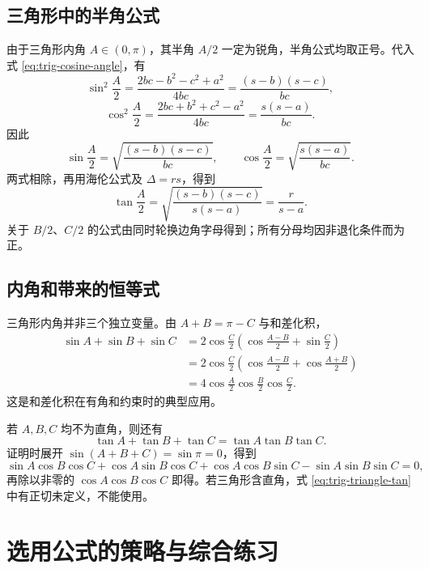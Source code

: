 \documentclass[UTF8,12pt,a4paper,fontset=fandol]{ctexart}
\begin{document}
\subsection{三角形中的半角公式}

由于三角形内角 $A\in(0,\pi)$，其半角 $A/2$ 一定为锐角，半角公式均取正号。代入式 \eqref{eq:trig-cosine-angle}，有
\[
  \sin^2\frac A2
  =\frac{2bc-b^2-c^2+a^2}{4bc}
  =\frac{(s-b)(s-c)}{bc},
\]
\[
  \cos^2\frac A2
  =\frac{2bc+b^2+c^2-a^2}{4bc}
  =\frac{s(s-a)}{bc}.
\]
因此
\begin{equation}\label{eq:trig-triangle-half}
  \boxed{\sin\frac A2=\sqrt{\frac{(s-b)(s-c)}{bc}},\qquad
  \cos\frac A2=\sqrt{\frac{s(s-a)}{bc}}}.
\end{equation}
两式相除，再用海伦公式及 $\Delta=rs$，得到
\begin{equation}\label{eq:trig-triangle-half-tan}
  \tan\frac A2
  =\sqrt{\frac{(s-b)(s-c)}{s(s-a)}}=\frac r{s-a}.
\end{equation}
关于 $B/2$、$C/2$ 的公式由同时轮换边角字母得到；所有分母均因非退化条件而为正。

\subsection{内角和带来的恒等式}

三角形内角并非三个独立变量。由 $A+B=\pi-C$ 与和差化积，
\begin{align*}
  \sin A+\sin B+\sin C
  &=2\cos\frac C2\left(\cos\frac{A-B}{2}+\sin\frac C2\right)\\
  &=2\cos\frac C2\left(\cos\frac{A-B}{2}+\cos\frac{A+B}{2}\right)\\
  &=4\cos\frac A2\cos\frac B2\cos\frac C2.
\end{align*}
这是和差化积在有角和约束时的典型应用。

若 $A,B,C$ 均不为直角，则还有
\begin{equation}\label{eq:trig-triangle-tan}
  \tan A+\tan B+\tan C=\tan A\tan B\tan C.
\end{equation}
证明时展开 $\sin(A+B+C)=\sin\pi=0$，得到
\[
  \sin A\cos B\cos C+\cos A\sin B\cos C
  +\cos A\cos B\sin C-\sin A\sin B\sin C=0,
\]
再除以非零的 $\cos A\cos B\cos C$ 即得。若三角形含直角，式 \eqref{eq:trig-triangle-tan} 中有正切未定义，不能使用。

\section{选用公式的策略与综合练习}
\end{document}
